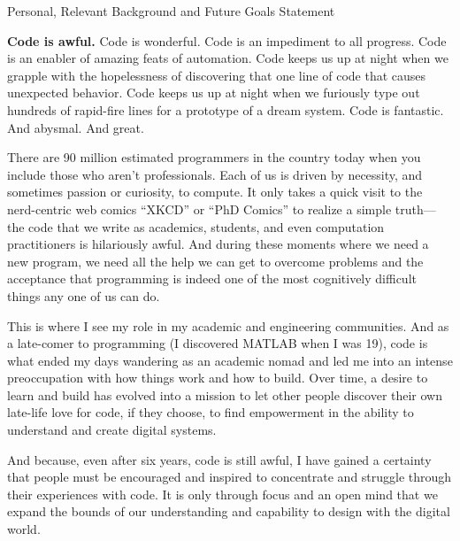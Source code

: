\documentclass[12pt]{memoir}
\title{}
\author{Andrew Head}
\begin{document}
\begin{center}
Personal, Relevant Background and Future Goals Statement
\end{center}
\vspace{-1ex}


\textbf{Code is awful.}
Code is wonderful.
Code is an impediment to all progress.
Code is an enabler of amazing feats of automation.
Code keeps us up at night when we grapple with the hopelessness of discovering that one line of code that causes unexpected behavior.
Code keeps us up at night when we furiously type out hundreds of rapid-fire lines for a prototype of a dream system.
Code is fantastic.
And abysmal.
And great.

There are 90 million estimated programmers in the country today when you include those who aren't professionals.
Each of us is driven by necessity, and sometimes passion or curiosity, to compute.
It only takes a quick visit to the nerd-centric web comics ``XKCD'' or ``PhD Comics'' to realize a simple truth---
the code that we write as academics, students, and even computation practitioners is hilariously awful.
And during these moments where we need a new program, we need all the help we can get to overcome problems and the acceptance that programming is indeed one of the most cognitively difficult things any one of us can do.

This is where I see my role in my academic and engineering communities.
And as a late-comer to programming (I discovered MATLAB when I was 19), code is what ended my days wandering as an academic nomad and led me into an intense preoccupation with how things work and how to build.
Over time, a desire to learn and build has evolved into a mission to let other people discover their own late-life love for code, if they choose, to find empowerment in the ability to understand and create digital systems.

And because, even after six years, code is still awful, I have gained a certainty that people must be encouraged and inspired to concentrate and struggle through their experiences with code.
It is only through focus and an open mind that we expand the bounds of our understanding and capability to design with the digital world.
\end{document}

